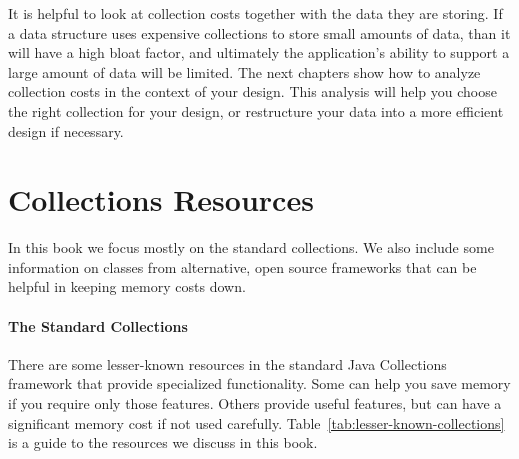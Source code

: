 It is helpful to look at collection costs 
together with the data they are storing. If a data structure uses expensive collections
to store small amounts of data, than it
will have a high bloat factor, and ultimately the application's ability to
support a large amount of data will be limited. The next chapters show
how to analyze collection costs in the context of your design.
This analysis will help you choose the right collection for your design, or
restructure your data into a more efficient design if necessary.


\section{Collections Resources}


In this book we focus
mostly on the standard collections. We also include some information on classes
from alternative, open source frameworks that can be helpful in keeping
memory costs down.


\paragraph{The Standard Collections} There are some
lesser-known resources in the standard Java Collections framework that provide specialized functionality. Some can help you
save memory if you require only those features.  Others provide useful
features, but can have a significant memory cost if not used carefully.
Table~\ref{tab:lesser-known-collections} is a guide to the resources we discuss
in this book.


